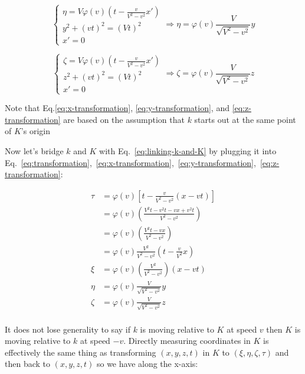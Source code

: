 \begin{tcolorbox}
    \begin{equation}\label{eq:y-transformation}
    \left\{
    \begin{array}{l}
        \eta = V\varphi(v)\left( t - \frac{v}{V^2 - v^2} x' \right) \\
        y^2 + (vt)^2 = (Vt)^2 \\
        x' = 0
    \end{array}
    \right.
    \Rightarrow
    \eta = \varphi(v)\frac{V}{\sqrt{V^2 - v^2}}y
    \end{equation}

    \begin{equation}\label{eq:z-transformation}
    \left\{
    \begin{array}{l}
        \zeta = V\varphi(v)\left( t - \frac{v}{V^2 - v^2} x' \right) \\
        z^2 + (vt)^2 = (Vt)^2 \\
        x' = 0
    \end{array}
    \right.
    \Rightarrow
    \zeta = \varphi(v)\frac{V}{\sqrt{V^2 - v^2}}z
    \end{equation}

    Note that Eq.\ref{eq:x-transformation}, \ref{eq:y-transformation}, and \ref{eq:z-transformation} are based on the
    assumption that $k$ starts out at the same point of $K$'s origin
\end{tcolorbox}

Now let's bridge $k$ and $K$ with Eq.~\ref{eq:linking-k-and-K} by plugging it into
Eq.~\ref{eq:transformation},~\ref{eq:x-transformation},~\ref{eq:y-transformation},~\ref{eq:z-transformation}:

\begin{align}
\tau  &= \varphi(v)\left[ t - \frac{v}{V^2 - v^2} (x - vt) \right] \\
      &= \varphi(v)\left( \frac{V^2t - v^2t - vx + v^2t}{V^2 - v^2} \right) \\
      &= \varphi(v)\left( \frac{V^2t - vx}{V^2 - v^2} \right) \\
      &= \varphi(v)\frac{V^2}{V^2 - v^2}\left( t - \frac{v}{V^2}x \right) \\
\xi   &= \varphi(v)\left( \frac{V^2}{V^2 - v^2} \right) (x - vt) \\
\eta  &= \varphi(v)\frac{V}{\sqrt{V^2 - v^2}}y \\
\zeta &= \varphi(v)\frac{V}{\sqrt{V^2 - v^2}}z \\
\end{align}

It does not lose generality to say if $k$ is moving relative to $K$ at speed $v$ then $K$ is moving relative to $k$ at
speed $-v$. Directly measuring coordinates in $K$ is effectively the same thing as transforming $(x, y, z, t)$ in $K$
to $(\xi, \eta, \zeta, \tau)$ and then back to $(x, y, z, t)$ so we have along the x-axis:

